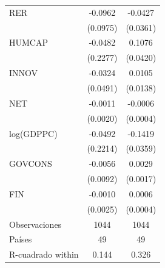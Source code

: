 {\begin{tabular}{l*{2}{c}}
\addlinespace
RER                 &     -0.0962         &     -0.0427         \\
                    &    (0.0975)         &    (0.0361)         \\
\addlinespace
HUMCAP              &     -0.0482         &      0.1076\sym{**} \\
                    &    (0.2277)         &    (0.0420)         \\
\addlinespace
INNOV               &     -0.0324         &      0.0105         \\
                    &    (0.0491)         &    (0.0138)         \\
\addlinespace
NET                 &     -0.0011         &     -0.0006\sym{*}  \\
                    &    (0.0020)         &    (0.0004)         \\
\addlinespace
log(GDPPC)          &     -0.0492         &     -0.1419\sym{***}\\
                    &    (0.2214)         &    (0.0359)         \\
\addlinespace
GOVCONS             &     -0.0056         &      0.0029\sym{*}  \\
                    &    (0.0092)         &    (0.0017)         \\
\addlinespace
FIN                 &     -0.0010         &      0.0006         \\
                    &    (0.0025)         &    (0.0004)         \\
\midrule
Observaciones       &        1044         &        1044         \\
Países              &          49         &          49         \\
R-cuadrado within   &       0.144         &       0.326         \\
\bottomrule
\end{tabular}
}
